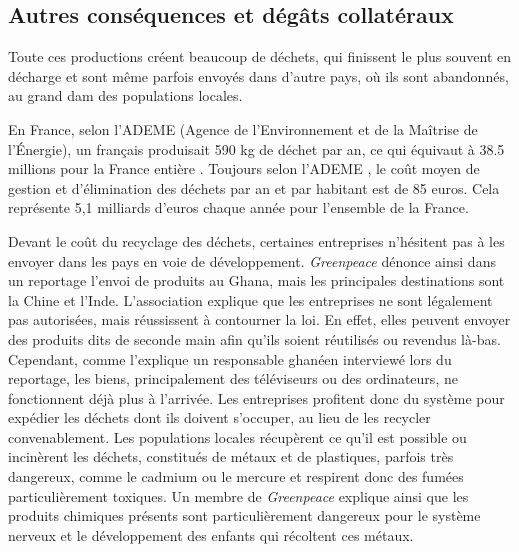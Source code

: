 \subsection{Autres conséquences et dégâts collatéraux}


Toute ces productions créent beaucoup de déchets, qui finissent le plus souvent en décharge et sont même parfois envoyés dans d'autre pays, où ils sont abandonnés, au grand dam des populations locales.

\bigbreak En France, selon l'ADEME (Agence de l’Environnement et de la Maîtrise de l’Énergie), un français produisait 590 kg de déchet par an, ce qui équivaut à 38.5 millions pour la France entière \cite{ademeStat} . Toujours selon l'ADEME \cite{ADEMEprodDechetFR}, le coût moyen de gestion et d'élimination des déchets par an et par habitant est de 85 euros. Cela représente 5,1 milliards d'euros chaque année pour l'ensemble de la France.

\medbreak Devant le coût du recyclage des déchets, certaines entreprises n’hésitent pas à les envoyer dans les pays en voie de développement. \textit{Greenpeace} dénonce ainsi dans un reportage \cite{GreenPeaceGhana} l'envoi de produits au Ghana, mais les principales destinations sont la Chine et l'Inde. L'association explique que les entreprises ne sont légalement pas autorisées, mais réussissent à contourner la loi. En effet, elles peuvent envoyer des produits dits de seconde main afin qu'ils soient réutilisés ou revendus là-bas. Cependant, comme l'explique un responsable ghanéen interviewé lors du reportage, les biens, principalement des téléviseurs ou des ordinateurs, ne fonctionnent déjà plus à l'arrivée. Les entreprises profitent donc du système pour expédier les déchets dont ils doivent s'occuper, au lieu de les recycler convenablement. Les populations locales récupèrent ce qu'il est possible ou incinèrent les déchets, constitués de métaux et de plastiques, parfois très dangereux, comme le cadmium ou le mercure et respirent donc des fumées particulièrement toxiques. Un membre de \textit{Greenpeace} explique ainsi que les produits chimiques présents sont particulièrement dangereux pour le système nerveux et le développement des enfants qui récoltent ces métaux.

